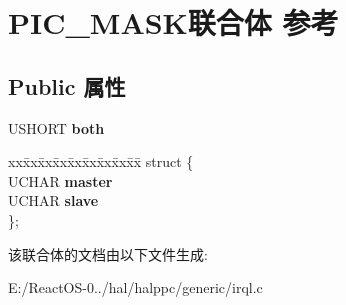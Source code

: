 \hypertarget{union_p_i_c___m_a_s_k}{}\section{P\+I\+C\+\_\+\+M\+A\+S\+K联合体 参考}
\label{union_p_i_c___m_a_s_k}
\subsection*{Public 属性}
\begin{DoxyCompactItemize}
\item 
\mbox{\label{union_p_i_c___m_a_s_k_a9f865d320f1d1b0649baec41fe29a607}} 
U\+S\+H\+O\+RT {\bfseries both}
\item 
\mbox{\label{union_p_i_c___m_a_s_k_a4717339b3eb99312f44474926ddbcdd2}} 
\begin{tabbing}
xx\=xx\=xx\=xx\=xx\=xx\=xx\=xx\=xx\=\kill
struct \{\\
\>UCHAR {\bfseries master}\\
\>UCHAR {\bfseries slave}\\
\}; \\

\end{tabbing}\end{DoxyCompactItemize}


该联合体的文档由以下文件生成\+:\begin{DoxyCompactItemize}
\item 
E\+:/\+React\+O\+S-\/0../hal/halppc/generic/irql.\+c\end{DoxyCompactItemize}
